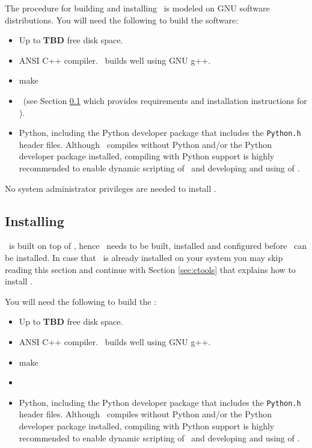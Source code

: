 \documentclass{article}[12pt,a4]
\begin{document}
The procedure for building and installing \this\ is modeled on GNU software distributions.
You will need the following to build the software:
\begin{itemize}
\item Up to {\bf TBD} free disk space.
\item ANSI C++ compiler. \this\ builds well using GNU g++.
\item make
\item \gammalib\ (see Section \ref{sec:gammalib} which provides requirements and installation 
instructions for \gammalib).
\item Python, including the Python developer package that includes the {\tt Python.h} header
files. Although \this\ compiles without Python and/or the Python developer package installed,
compiling with Python support is highly recommended to enable dynamic scripting of \ctools\
and developing and using of \cscripts. 
\end{itemize}
No system administrator privileges are needed to install \this.


\subsection{Installing \gammalib}
\label{sec:gammalib}

\this\ is built on top of \gammalib, hence \gammalib\ needs to be built, installed and configured
before \this\ can be installed.
In case that \this\ is already installed on your system you may skip reading this section
and continue with Section \ref{sec:ctools} that explains how to install \this.

You will need the following to build the \gammalib:
\begin{itemize}
\item Up to {\bf TBD} free disk space.
\item ANSI C++ compiler. \this\ builds well using GNU g++.
\item make
\item \cfitsio
\item Python, including the Python developer package that includes the {\tt Python.h} header
files. Although \this\ compiles without Python and/or the Python developer package installed,
compiling with Python support is highly recommended to enable dynamic scripting of \ctools\
and developing and using of \cscripts. 
\end{itemize}
\end{document}
